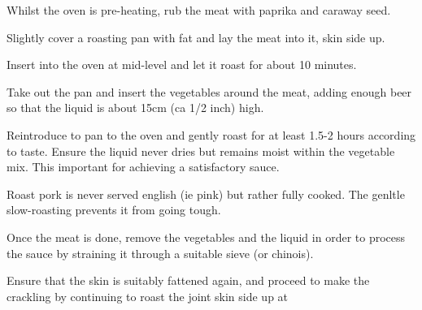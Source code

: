 \begin{method}
     	Whilst the oven is pre-heating, rub the meat with paprika and caraway seed.

	Slightly cover a roasting pan with fat and lay the meat into it, skin side up.

	Insert into the oven at mid-level and let it roast for about 10 minutes.   

	Take out the pan and insert the vegetables around the meat, adding enough beer so that the liquid is about 15cm (ca 1/2 inch) high.

	Reintroduce to pan to the oven and gently roast for at least 1.5-2 hours according to taste.   Ensure the liquid never dries but remains moist within the vegetable mix.  This important for achieving a satisfactory sauce.

	Roast pork is never served english (ie pink) but rather fully cooked.  The genltle slow-roasting prevents it from going tough.

	Once the meat is done, remove the vegetables and the liquid in order to process the sauce by straining it through a suitable sieve (or chinois).  

	Ensure that the skin is suitably fattened again, and proceed to make the crackling by continuing to roast the joint skin side up at 
\end {method}